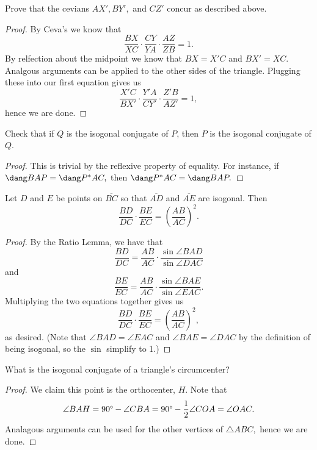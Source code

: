 \documentclass[letterpaper,oneside]{scrartcl}
\providecommand{\ol}{\overline}
\begin{document}
\begin{problem*}
  [4.20]
  Prove that the cevians $AX', BY',$ and $CZ'$ concur as described above.
\end{problem*}
\begin{proof}
  By Ceva's we know that
  $$\frac{BX}{XC}\cdot\frac{CY}{YA}\cdot\frac{AZ}{ZB}=1.$$
  By relfection about the midpoint we know that $BX = X'C$ and $BX' = XC.$ Analgous arguments can be applied to the other sides of the triangle. Plugging these into our first equation gives us
  $$\frac{X'C}{BX'}\cdot\frac{Y'A}{CY'}\cdot\frac{Z'B}{AZ'}=1,$$ hence we are done.
\end{proof}

\begin{problem*}
  [4.21]
  Check that if $Q$ is the isogonal conjugate of $P$, then $P$ is the isogonal conjugate of $Q$.
\end{problem*}
\begin{proof}
  This is trivial by the reflexive property of equality. For instance, if $\dang BAP = \dang P^*AC,$ then $\dang P^*AC = \dang BAP.$
\end{proof}

\begin{theorem*}
  Let $D$ and $E$ be points on $\ol{BC}$ so that $\ol{AD}$ and $\ol{AE}$ are isogonal. Then
  $$\frac{BD}{DC}\cdot\frac{BE}{EC}=\left(\frac{AB}{AC}\right)^2.$$
\end{theorem*}
\begin{proof}
  By the Ratio Lemma, we have that
  $$\frac{BD}{DC} = \frac{AB}{AC}\cdot\frac{\sin\angle BAD}{\sin\angle DAC}$$ and $$\frac{BE}{EC} = \frac{AB}{AC}\cdot\frac{\sin\angle BAE}{\sin\angle EAC}.$$
  Multiplying the two equations together gives us
  $$\frac{BD}{DC}\cdot\frac{BE}{EC}=\left(\frac{AB}{AC}\right)^2,$$ as desired. (Note that $\angle BAD = \angle EAC$ and $\angle BAE = \angle DAC$ by the definition of being isogonal, so the $\sin$ simplify to 1.)
\end{proof}

\begin{problem*}
  [4.23]
  What is the isogonal conjugate of a triangle’s circumcenter?
\end{problem*}
\begin{proof}
  We claim this point is the orthocenter, $H$. Note that $$\angle BAH = 90\degree - \angle CBA = 90\degree - \frac12\angle COA = \angle OAC.$$
  Analagous arguments can be used for the other vertices of $\triangle ABC,$ hence we are done.
\end{proof}
\end{document}
